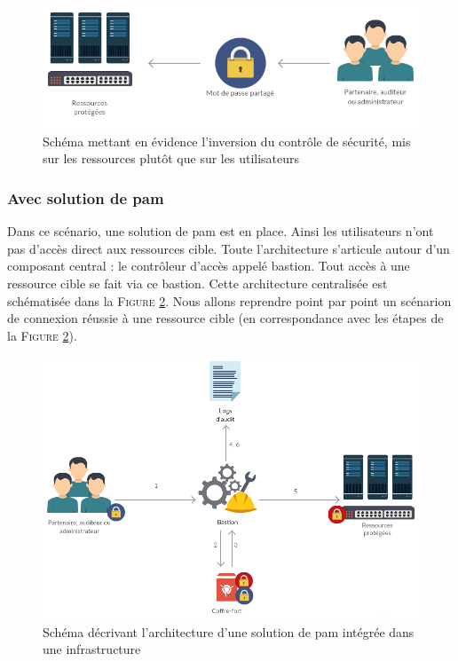 \begin{figure}[!ht]
    \center
    \includegraphics[width=\textwidth]{./images/ressource_centered.png}
    \caption{Schéma mettant en évidence l'inversion du contrôle de sécurité, mis sur les ressources plutôt que sur les utilisateurs}
    \label{fig:invcont}
\end{figure}

\subsubsection{Avec solution de \gls{pam}}
\label{par:withpam}

Dans ce scénario, une solution de \gls{pam} est en place. Ainsi les utilisateurs n'ont pas d'accès direct aux ressources cible. Toute l'architecture s'articule autour d'un composant central : le contrôleur d'accès appelé \gls{bastion}. Tout accès à une ressource cible se fait via ce \gls{bastion}. Cette architecture centralisée est schématisée dans la \textsc{Figure} \ref{fig:schempam}. Nous allons reprendre point par point un scénarion de connexion réussie à une ressource cible (en correspondance avec les étapes de la \textsc{Figure} \ref{fig:schempam}).

\begin{figure}[!ht]
    \center
    \includegraphics[width=\textwidth]{./images/Schema_PAM.png}
    \caption{Schéma décrivant l'architecture d'une solution de \gls{pam} intégrée dans une infrastructure}
    \label{fig:schempam}
\end{figure}

